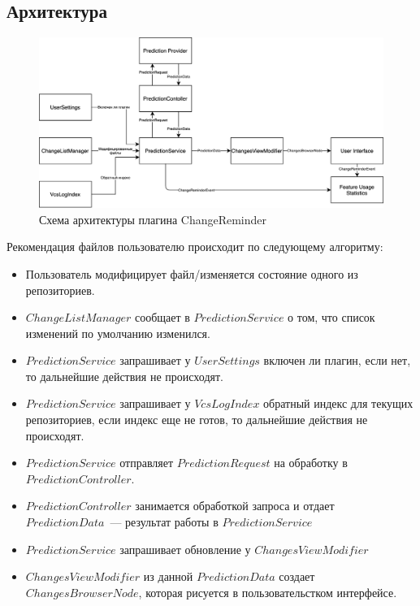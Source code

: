 \subsection{Архитектура}
\begin{figure}[!h]
\caption{Схема архитектуры плагина ChangeReminder}\label{ChangeReminder-arch}
\centering
\includegraphics[scale=0.14]{images/ChangeReminderArch.png}
\end{figure}
Рекомендация файлов пользователю происходит по следующему алгоритму:
    \begin{itemize}
        \item Пользователь модифицирует файл/изменяется состояние одного из репозиториев.
        \item $ChangeListManager$ сообщает в $PredictionService$ о том, что список изменений по умолчанию изменился.
        \item $PredictionService$ запрашивает у $UserSettings$ включен ли плагин, если нет, то дальнейшие действия не происходят.
        \item $PredictionService$ запрашивает у $VcsLogIndex$ обратный индекс для текущих репозиториев, если индекс еще не готов, то дальнейшие действия не происходят.
        \item $PredictionService$ отправляет $PredictionRequest$ на обработку в $PredictionController$.
        \item $PredictionController$ занимается обработкой запроса и отдает $PredictionData$~--- результат работы в $PredictionService$
        \item $PredictionService$ запрашивает обновление у $ChangesViewModifier$
        \item $ChangesViewModifier$ из данной $PredictionData$ создает $ChangesBrowserNode$, которая рисуется в пользовательстком интерфейсе.
    \end{itemize}
    
